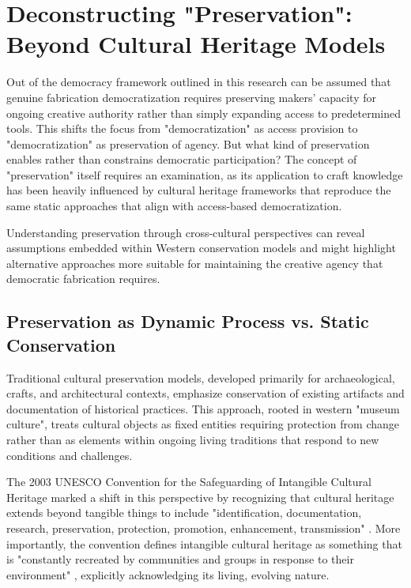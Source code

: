 \section{Deconstructing "Preservation": Beyond Cultural Heritage Models}

Out of the democracy framework outlined in this research can be assumed that genuine fabrication democratization requires preserving makers' capacity for ongoing creative authority rather than simply expanding access to predetermined tools. This shifts the focus from "democratization" as access provision to "democratization" as preservation of agency. But what kind of preservation enables rather than constrains democratic participation? The concept of "preservation" itself requires an examination, as its application to craft knowledge has been heavily influenced by cultural heritage frameworks that reproduce the same static approaches that align with access-based democratization.

\vspace{0.5cm}

Understanding preservation through cross-cultural perspectives can reveal assumptions embedded within Western conservation models and might highlight alternative approaches more suitable for maintaining the creative agency that democratic fabrication requires.

\subsection{Preservation as Dynamic Process vs. Static Conservation}

Traditional cultural preservation models, developed primarily for archaeological, crafts, and architectural contexts, emphasize conservation of existing artifacts and documentation of historical practices. This approach, rooted in western "museum culture", treats cultural objects as fixed entities requiring protection from change rather than as elements within ongoing living traditions that respond to new conditions and challenges.

\vspace{0.5cm}

The 2003 UNESCO Convention for the Safeguarding of Intangible Cultural Heritage marked a shift in this perspective by recognizing that cultural heritage extends beyond tangible things to include "identification, documentation, research, preservation, protection, promotion, enhancement, transmission" \citep{unesco2003}. More importantly, the convention defines intangible cultural heritage as something that is "constantly recreated by communities and groups in response to their environment" \citep{unesco2003}, explicitly acknowledging its living, evolving nature.

